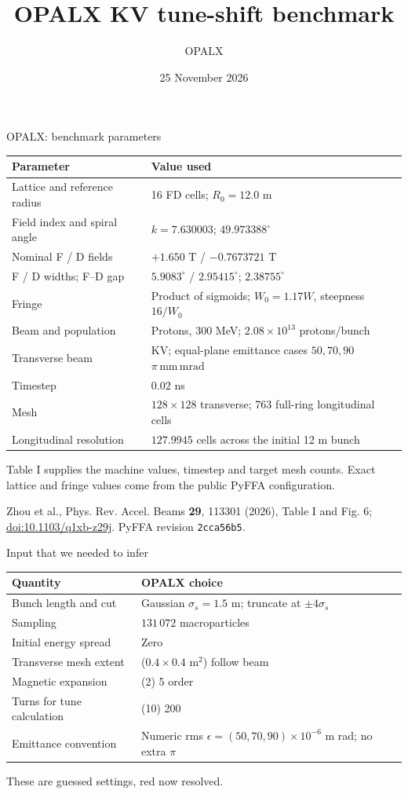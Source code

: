 \documentclass[aspectratio=169,11pt]{beamer}
\title{OPALX KV tune-shift benchmark}
\author{OPALX}
\date{25 November 2026}
\newcommand{\src}[1]{\par\vfill{\color{muted}\scriptsize #1\par}}
\newcommand{\epsunit}{\ensuremath{\pi\,\mathrm{mm\,mrad}}}
\begin{document}
\begin{frame}{OPALX: benchmark parameters}
\small
\begin{tabularx}{\linewidth}{lY}
\toprule Parameter & Value used \\
\midrule
Lattice and reference radius & 16 FD cells; $R_0=12.0$ m \\
Field index and spiral angle & $k=7.630003$; $49.973388^\circ$ \\
Nominal F / D fields & $+1.650$ T / $-0.7673721$ T \\
F / D widths; F--D gap & $5.9083^\circ$ / $2.95415^\circ$; $2.38755^\circ$ \\
Fringe & Product of sigmoids; $W_0=1.17W$, steepness $16/W_0$ \\
Beam and population & Protons, $300$ MeV; $2.08\times10^{13}$ protons/bunch \\
Transverse beam & KV; equal-plane emittance cases $50,70,90$ \epsunit \\
Timestep & $0.02$ ns \\
Mesh & $128\times128$ transverse; 763 full-ring longitudinal cells \\
Longitudinal resolution & $127.9945$ cells across the initial 12 m bunch \\
\bottomrule
\end{tabularx}\par
\vspace{3mm}
\footnotesize Table I supplies the machine values, timestep and target mesh counts. Exact lattice and fringe values come from the public PyFFA configuration.
\src{Zhou et al., Phys. Rev. Accel. Beams \textbf{29}, 113301 (2026), Table I and Fig. 6; \href{https://doi.org/10.1103/q1xb-z29j}{doi:10.1103/q1xb-z29j}. PyFFA revision \texttt{2cca56b5}.}
\end{frame}

\begin{frame}{Input that we needed to infer}
\small
\begin{tabularx}{\linewidth}{lY}
\toprule Quantity & OPALX choice \\
\midrule
Bunch length and cut & Gaussian $\sigma_s=1.5$ m; truncate at $\pm4\sigma_s$ \\
Sampling & $131\,072$ macroparticles \\
Initial energy spread & Zero \\
Transverse mesh extent & ($0.4\times0.4$ m$^2$)  {\color{red} follow beam}\\
Magnetic expansion & (2) {\color{red} 5} order \\
Turns for tune calculation & (10)  {\color{red} 200}  \\ 
Emittance convention & Numeric rms $\epsilon=(50,70,90)\times10^{-6}$ m rad; no extra $\pi$ \\
\bottomrule
\end{tabularx}\par
\vspace{3mm}
\footnotesize These are guessed settings, {\color{red} red} now resolved. 
\end{frame}
\end{document}

